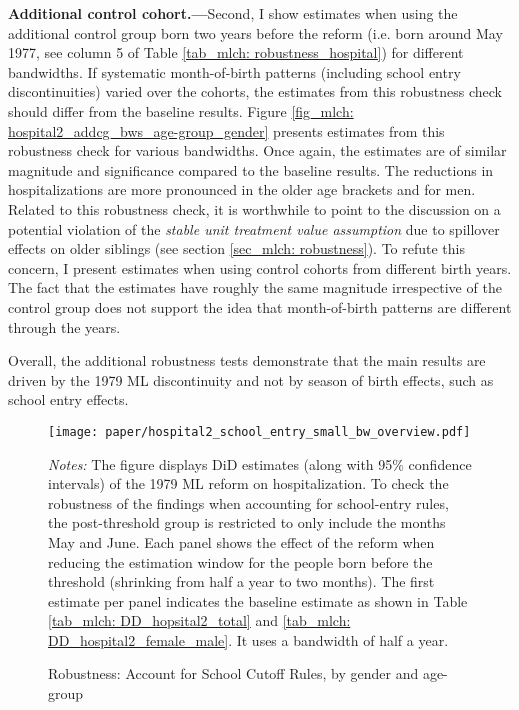 \textbf{Additional control cohort.---}Second, I show estimates when using the additional control group born two years before the reform (i.e. born around May 1977, see column 5 of Table \ref{tab_mlch: robustness_hospital}) for different bandwidths. If systematic month-of-birth patterns (including school entry discontinuities) varied over the cohorts, the estimates from this robustness check should differ from the baseline results. Figure \ref{fig_mlch: hospital2_addcg_bws_age-group_gender} presents estimates from this robustness check for various bandwidths. Once again, the estimates are of similar magnitude and significance compared to the baseline results. The reductions in hospitalizations are more pronounced in the older age brackets and for men. Related to this robustness check, it is worthwhile to point to the discussion on a potential violation of the \textit{stable unit treatment value assumption} due to spillover effects on older siblings (see section \ref{sec_mlch: robustness}). To refute this concern, I present estimates when using control cohorts from different birth years. The fact that the estimates have roughly the same magnitude irrespective of the control group does not support the idea that month-of-birth patterns are different through the years.

Overall, the additional robustness tests demonstrate that the main results are driven by the 1979 ML discontinuity and not by season of birth effects, such as school entry effects.




 




\begin{landscape}
	\vspace*{\fill}
	\begin{figure}[H]\centering
		\caption{Robustness: Account for School Cutoff Rules, by gender and age-group}\label{fig_mlch: hospital2_school_cutoff}
		\texttt{[image: paper/hospital2\_school\_entry\_small\_bw\_overview.pdf]}
		\scriptsize
		\begin{minipage}{0.95\linewidth}
			\emph{Notes:} The figure displays DiD estimates (along with 95\% confidence intervals) of the 1979 ML reform on hospitalization. To check the robustness of the findings when accounting for school-entry rules, the post-threshold group is restricted to only include the months May and June. Each panel shows the effect of the reform when reducing the estimation window for the people born before the threshold (shrinking from half a year to two months). The first estimate per panel indicates the baseline estimate as shown in Table \ref{tab_mlch: DD_hopsital2_total} and \ref{tab_mlch: DD_hospital2_female_male}. It uses a bandwidth of half a year.
		\end{minipage}
	\end{figure}
	\vspace*{\fill}\clearpage
\end{landscape}
\restoregeometry 




